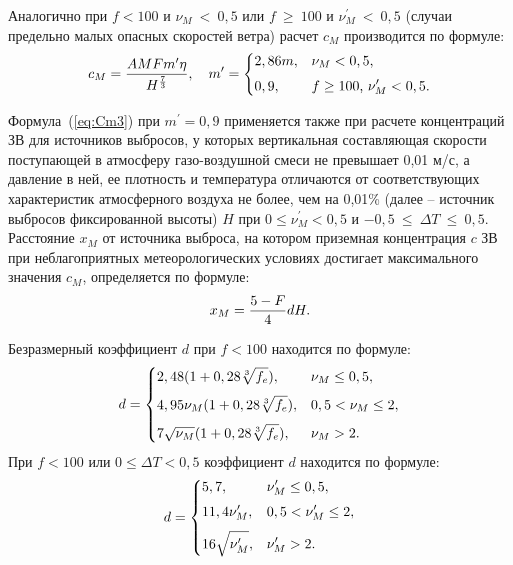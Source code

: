\documentclass[14pt, a4paper]{extreport}
\begin{document}
	Аналогично при $f < 100$ и $\nu_M~<~0,5$ или $f~\geq~100$ и $\nu_M^\prime~<~0,5$ (случаи предельно малых опасных скоростей ветра) расчет $c_M$ производится по формуле:
	\begin{equation}
		c_M = \frac{AMFm^\prime \eta}{H^{\frac{7}{3}}},\quad m^\prime = 
		\begin{dcases}
			2,86 m, & \nu_M < 0,5, \vspace*{0.1cm} \\
			0,9, & f \geq 100 \textup{, } \nu_M^\prime < 0,5.
		\end{dcases}
		\label{eq:Cm3}
	\end{equation}
	
	Формула~(\ref{eq:Cm3}) при $m^\prime = 0,9$ применяется также при расчете концентраций ЗВ для источников выбросов, у которых вертикальная составляющая скорости поступающей в атмосферу газо-воздушной смеси не превышает 0,01 м/с, а давление в ней, ее плотность и температура отличаются от соответствующих характеристик атмосферного воздуха не более, чем на 0,01\% (далее -- источник выбросов фиксированной высоты) $H$ при $0 \leq \nu_M^\prime < 0,5$ и $-0,5~\leq~\Delta T~\leq~0,5$. Расстояние $x_M$ от источника выброса, на котором приземная концентрация $c$ ЗВ при неблагоприятных метеорологических условиях достигает максимального значения $c_M$, определяется по формуле:
	\begin{equation*}
		x_M = \frac{5 - F}{4} d H.
		\label{eq:Xm}
		\vspace*{-0.2cm}
	\end{equation*}
	
	Безразмерный коэффициент $d$ при $f<100$ находится по формуле:
	\begin{equation*}
		d = 
		\begin{dcases}
			2,48(1 + 0,28\sqrt[3]{f_e}), & \nu_M \leq 0,5,  \vspace*{0.1cm} \\
			4,95 \nu_M (1 + 0,28\sqrt[3]{f_e}), &  0,5 < \nu_M \leq 2, \vspace*{0.1cm} \\
			7 \sqrt{\nu_M}(1 + 0,28\sqrt[3]{f_e}), &  \nu_M > 2. 
		\end{dcases}
		\label{eq:d3}
	\end{equation*}
	При $f<100$ или $0 \leq \Delta T < 0,5$ коэффициент $d$ находится по формуле:
	\begin{equation*}
		d = 
		\begin{dcases}
			5,7, &  \nu_M^\prime \leq 0,5,  \vspace*{0.1cm} \\
			11,4 \nu_M^\prime, &  0,5 < \nu_M^\prime \leq 2,  \vspace*{0.1cm} \\
			16 \sqrt{\nu_M^\prime}, & \nu_M^\prime > 2.
		\end{dcases}
		\label{eq:d6}
	\end{equation*}
	
\end{document}
